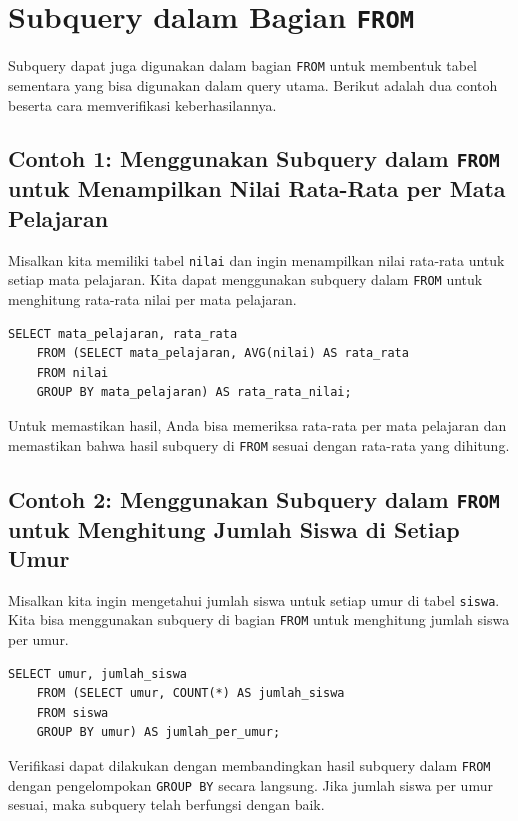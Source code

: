 \section{Subquery dalam Bagian \texttt{FROM}}

Subquery dapat juga digunakan dalam bagian \texttt{FROM} untuk membentuk tabel sementara yang bisa digunakan dalam query utama. Berikut adalah dua contoh beserta cara memverifikasi keberhasilannya.

\subsection*{Contoh 1: Menggunakan Subquery dalam \texttt{FROM} untuk Menampilkan Nilai Rata-Rata per Mata Pelajaran}
Misalkan kita memiliki tabel \texttt{nilai} dan ingin menampilkan nilai rata-rata untuk setiap mata pelajaran. Kita dapat menggunakan subquery dalam \texttt{FROM} untuk menghitung rata-rata nilai per mata pelajaran.

\begin{lstlisting}[style=sql]
	SELECT mata_pelajaran, rata_rata
	FROM (SELECT mata_pelajaran, AVG(nilai) AS rata_rata
	FROM nilai
	GROUP BY mata_pelajaran) AS rata_rata_nilai;
\end{lstlisting}

Untuk memastikan hasil, Anda bisa memeriksa rata-rata per mata pelajaran dan memastikan bahwa hasil subquery di \texttt{FROM} sesuai dengan rata-rata yang dihitung.

\subsection*{Contoh 2: Menggunakan Subquery dalam \texttt{FROM} untuk Menghitung Jumlah Siswa di Setiap Umur}
Misalkan kita ingin mengetahui jumlah siswa untuk setiap umur di tabel \texttt{siswa}. Kita bisa menggunakan subquery di bagian \texttt{FROM} untuk menghitung jumlah siswa per umur.

\begin{lstlisting}[style=sql]
	SELECT umur, jumlah_siswa
	FROM (SELECT umur, COUNT(*) AS jumlah_siswa
	FROM siswa
	GROUP BY umur) AS jumlah_per_umur;
\end{lstlisting}

Verifikasi dapat dilakukan dengan membandingkan hasil subquery dalam \texttt{FROM} dengan pengelompokan \texttt{GROUP BY} secara langsung. Jika jumlah siswa per umur sesuai, maka subquery telah berfungsi dengan baik.

